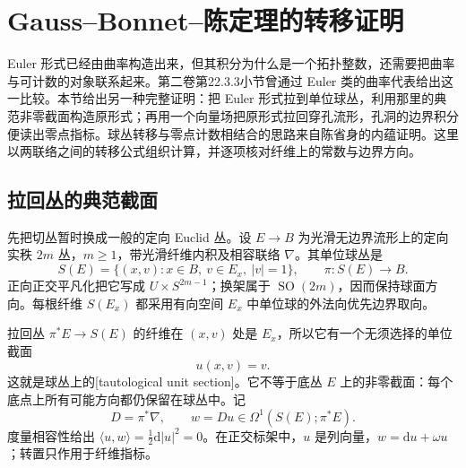 
% 
% 

\section{Gauss–Bonnet–陈定理的转移证明}
\label{g3:sec:1702}

Euler 形式已经由曲率构造出来，但其积分为什么是一个拓扑整数，还需要把曲率与可计数的对象联系起来。第二卷第22.3.3小节曾通过 Euler 类的曲率代表给出这一比较。本节给出另一种完整证明：把 Euler 形式拉到单位球丛，利用那里的典范非零截面构造原形式；再用一个向量场把原形式拉回穿孔流形，孔洞的边界积分便读出零点指标。球丛转移与零点计数相结合的思路来自陈省身的内蕴证明\cite[第2--3节，第749--752页]{Chern1944GaussBonnet}。这里以两联络之间的转移公式组织计算，并逐项核对纤维上的常数与边界方向。

\subsection{拉回丛的典范截面}
\label{g3:subsec:1702:01}
先把切丛暂时换成一般的定向 Euclid 丛。设 \(E\to B\) 为光滑无边界流形上的定向实秩 \(2m\) 丛，\(m\ge1\)，带光滑纤维内积及相容联络 \(\nabla\)。其单位球丛是
\[
	S(E)=\{(x,v):x\in B,\ v\in E_x,\ |v|=1\},
	\qquad \pi:S(E)\longrightarrow B.
\]
正向正交平凡化把它写成 \(U\times S^{2m-1}\)；换架属于 \(\operatorname{SO}(2m)\)，因而保持球面方向。每根纤维 \(S(E_x)\) 都采用有向空间 \(E_x\) 中单位球的外法向优先边界取向。

\ProseParagraphBreak

拉回丛 \(\pi^*E\to S(E)\) 的纤维在 \((x,v)\) 处是 \(E_x\)，所以它有一个无须选择的单位截面
\begin{equation}\label{g3:eq:sphere-tautological-section}
	u(x,v)=v.
\end{equation}
这就是球丛上的[tautological unit section]。它不等于底丛 \(E\) 上的非零截面：每个底点上所有可能方向都仍保留在球丛中。记
\[
	D=\pi^*\nabla,\qquad w=Du\in\Omega^1(S(E);\pi^*E).
\]
度量相容性给出 \(\langle u,w\rangle=\frac12\mathrm d|u|^2=0\)。在正交标架中，\(u\) 是列向量，\(w=\mathrm du+\omega u\)；转置只作用于纤维指标。

